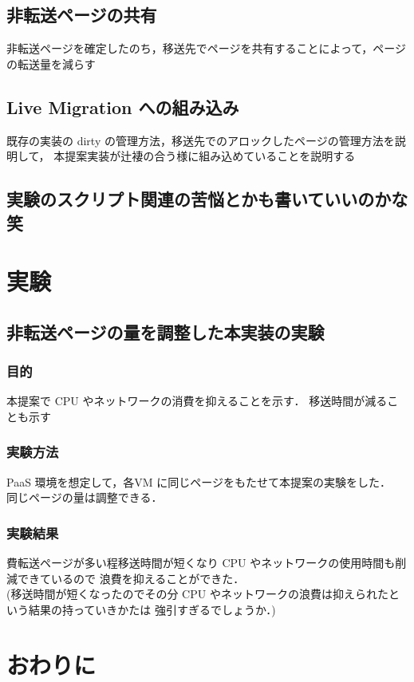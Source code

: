 \documentclass[graduation-thesis]{mlarticle}
\begin{document}
\subsection{非転送ページの共有}
\label{sec-5-4}
非転送ページを確定したのち，移送先でページを共有することによって，ページの転送量を減らす
\subsection{Live Migration への組み込み}
\label{sec-5-5}
既存の実装の dirty の管理方法，移送先でのアロックしたページの管理方法を説明して，
本提案実装が辻褄の合う様に組み込めていることを説明する

\subsection{実験のスクリプト関連の苦悩とかも書いていいのかな笑}
\label{sec-5-6}
\clearpage
\section{実験}
\label{sec-6}
\subsection{非転送ページの量を調整した本実装の実験}
\label{sec-6-1}
\subsubsection{目的}
\label{sec-6-1-1}
本提案で CPU やネットワークの消費を抑えることを示す．
移送時間が減ることも示す
\subsubsection{実験方法}
\label{sec-6-1-2}
PaaS 環境を想定して，各VM に同じページをもたせて本提案の実験をした．\\
    同じページの量は調整できる．
\subsubsection{実験結果}
\label{sec-6-1-3}
費転送ページが多い程移送時間が短くなり CPU やネットワークの使用時間も削減できているので
浪費を抑えることができた．\\
    (移送時間が短くなったのでその分 CPU やネットワークの浪費は抑えられたという結果の持っていきかたは
強引すぎるでしょうか．)
\clearpage
\section{おわりに}
\label{sec-7}
\end{document}
